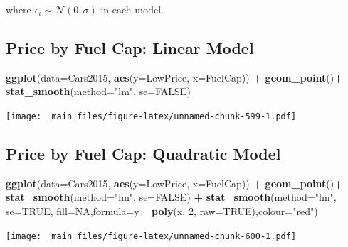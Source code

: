 \documentclass[]{book}
\newenvironment{Shaded}{\begin{snugshade}}{\end{snugshade}}
\newcommand{\KeywordTok}[1]{\textcolor[rgb]{0.13,0.29,0.53}{\textbf{#1}}}
\newcommand{\DataTypeTok}[1]{\textcolor[rgb]{0.13,0.29,0.53}{#1}}
\newcommand{\DecValTok}[1]{\textcolor[rgb]{0.00,0.00,0.81}{#1}}
\newcommand{\StringTok}[1]{\textcolor[rgb]{0.31,0.60,0.02}{#1}}
\newcommand{\OtherTok}[1]{\textcolor[rgb]{0.56,0.35,0.01}{#1}}
\newcommand{\OperatorTok}[1]{\textcolor[rgb]{0.81,0.36,0.00}{\textbf{#1}}}
\newcommand{\NormalTok}[1]{#1}
\begin{document}
where \(\epsilon_i \sim \mathcal{N}(0, \sigma)\) in each model.

\subsection{Price by Fuel Cap: Linear
Model}\label{price-by-fuel-cap-linear-model}

\begin{Shaded}
\begin{Highlighting}[]
\KeywordTok{ggplot}\NormalTok{(}\DataTypeTok{data=}\NormalTok{Cars2015, }\KeywordTok{aes}\NormalTok{(}\DataTypeTok{y=}\NormalTok{LowPrice, }\DataTypeTok{x=}\NormalTok{FuelCap)) }\OperatorTok{+}\StringTok{ }\KeywordTok{geom_point}\NormalTok{()}\OperatorTok{+}\StringTok{ }\KeywordTok{stat_smooth}\NormalTok{(}\DataTypeTok{method=}\StringTok{"lm"}\NormalTok{, }\DataTypeTok{se=}\OtherTok{FALSE}\NormalTok{)}
\end{Highlighting}
\end{Shaded}

\texttt{[image: \_main\_files/figure-latex/unnamed-chunk-599-1.pdf]}

\subsection{Price by Fuel Cap: Quadratic
Model}\label{price-by-fuel-cap-quadratic-model}

\begin{Shaded}
\begin{Highlighting}[]
\KeywordTok{ggplot}\NormalTok{(}\DataTypeTok{data=}\NormalTok{Cars2015, }\KeywordTok{aes}\NormalTok{(}\DataTypeTok{y=}\NormalTok{LowPrice, }\DataTypeTok{x=}\NormalTok{FuelCap)) }\OperatorTok{+}\StringTok{ }\KeywordTok{geom_point}\NormalTok{()}\OperatorTok{+}\StringTok{ }\KeywordTok{stat_smooth}\NormalTok{(}\DataTypeTok{method=}\StringTok{"lm"}\NormalTok{, }\DataTypeTok{se=}\OtherTok{FALSE}\NormalTok{) }\OperatorTok{+}
\StringTok{ }\KeywordTok{stat_smooth}\NormalTok{(}\DataTypeTok{method=}\StringTok{"lm"}\NormalTok{, }\DataTypeTok{se=}\OtherTok{TRUE}\NormalTok{, }\DataTypeTok{fill=}\OtherTok{NA}\NormalTok{,}\DataTypeTok{formula=}\NormalTok{y }\OperatorTok{~}\StringTok{ }\KeywordTok{poly}\NormalTok{(x, }\DecValTok{2}\NormalTok{, }\DataTypeTok{raw=}\OtherTok{TRUE}\NormalTok{),}\DataTypeTok{colour=}\StringTok{"red"}\NormalTok{) }
\end{Highlighting}
\end{Shaded}

\texttt{[image: \_main\_files/figure-latex/unnamed-chunk-600-1.pdf]}
\end{document}
